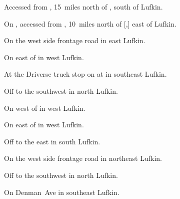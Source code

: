 
\begin{LocationList}

Accessed from , 15~miles north of , south of Lufkin.

On , accessed from , 10~miles north of [,] east of Lufkin.

\Location{\GarageHQ \Garage}
On the west side   frontage road in east Lufkin.

On  east of  in west Lufkin.

At the Driverse truck stop on  at  in southeast Lufkin.

Off   to the southwest in north Lufkin.

On  west of  in west Lufkin.

On  east of  in west Lufkin.

Off  to the east in south Lufkin.

\Location{\TruckService \Service}
On the west side   frontage road in northeast Lufkin.

Off   to the southwest in north Lufkin.

On  Denman~Ave in southeast Lufkin.

\end{LocationList}
